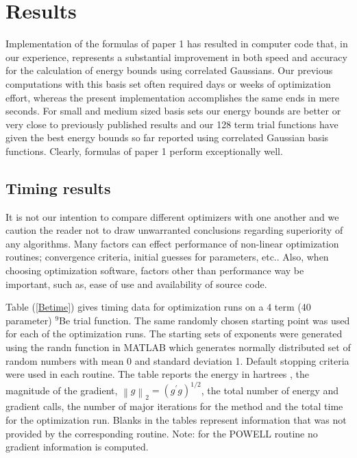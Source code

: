 \documentclass[12pt,thmsa,suthesis,verbatim]{report}
\begin{document}
\section{Results}

Implementation of the formulas of paper 1 has resulted in computer code
that, in our experience, represents a substantial improvement in both speed
and accuracy for the calculation of energy bounds using correlated
Gaussians. Our previous computations with this basis set often required days
or weeks of optimization effort, whereas the present implementation
accomplishes the same ends in mere seconds. For small and medium sized basis
sets our energy bounds are better or very close to previously published
results and our 128 term trial functions have given the best energy bounds
so far reported using correlated Gaussian basis functions. Clearly, formulas
of paper 1 perform exceptionally well.

\subsection{Timing results}

It is not our intention to compare different optimizers with one another and
we caution the reader not to draw unwarranted conclusions regarding
superiority of any algorithms. Many factors can effect performance of
non-linear optimization routines; convergence criteria, initial guesses for
parameters, etc.. Also, when choosing optimization software, factors other
than performance way be important, such as, ease of use and availability of
source code.

Table (\ref{Betime}) gives timing data for optimization runs on a 4 term (40
parameter) $^9$Be trial function. The same randomly chosen starting point
was used for each of the optimization runs. The starting sets of exponents
were generated using the randn function in MATLAB which generates normally
distributed set of random numbers with mean 0 and standard deviation 1.
Default stopping criteria were used in each routine. The table reports the
energy in hartrees , the magnitude of the gradient, $\left\| g\right\|
_2=\left( g^{\prime }g\right) ^{1/2}$, the total number of energy and
gradient calls, the number of major iterations for the method and the total
time for the optimization run. Blanks in the tables represent information
that was not provided by the corresponding routine. Note: for the POWELL
routine no gradient information is computed.
\end{document}
